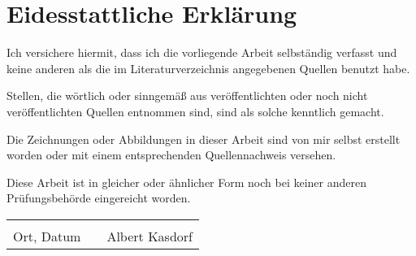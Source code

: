 %
%

\chapter*{Eidesstattliche Erklärung}

\thispagestyle{empty}


Ich versichere hiermit, dass ich die vorliegende Arbeit selbständig verfasst und keine anderen als die im Literaturverzeichnis angegebenen Quellen benutzt habe.

Stellen, die wörtlich oder sinngemäß aus veröffentlichten oder noch nicht veröffentlichten Quellen entnommen sind, sind als solche kenntlich gemacht.

Die Zeichnungen oder Abbildungen in dieser Arbeit sind von mir selbst erstellt worden oder mit einem entsprechenden Quellennachweis versehen.

Diese Arbeit ist in gleicher oder ähnlicher Form noch bei keiner anderen Prüfungsbehörde eingereicht worden.

\vspace{1cm}

\begin{center}
\begin{tabular}[h]{lp{2cm}p{5.5cm}}
& & \\
\cline{1-1}\cline{3-3}
Ort, Datum& & Albert Kasdorf\\
\end{tabular}
\end{center}